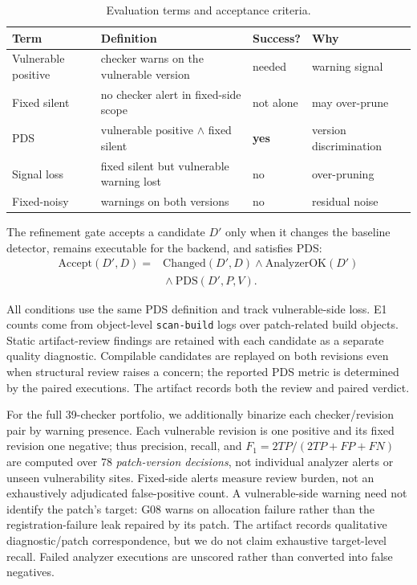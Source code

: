 \begin{table}[t]
  \centering
  \footnotesize
  \setlength{\tabcolsep}{3pt}
  \caption{Evaluation terms and acceptance criteria.}
  \label{tab:terminology}
  \begin{tabular}{@{}p{}p{}p{}p{}@{}}
    \toprule
    Term & Definition & Success? & Why \\
    \midrule
    Vulnerable positive & checker warns on the vulnerable version & needed & warning signal \\
    Fixed silent & no checker alert in fixed-side scope & not alone & may over-prune \\
    PDS & vulnerable positive $\wedge$ fixed silent & \textbf{yes} & version discrimination \\
    Signal loss & fixed silent but vulnerable warning lost & no & over-pruning \\
    Fixed-noisy & warnings on both versions & no & residual noise \\
    \bottomrule
  \end{tabular}
\end{table}

The refinement gate accepts a candidate $D'$ only when it changes the baseline detector, remains executable for the backend, and satisfies PDS:
\begin{equation}
\begin{aligned}
\mathrm{Accept}(D',D) ={}& \mathrm{Changed}(D',D)\land \mathrm{AnalyzerOK}(D')\\
&{}\land \mathrm{PDS}(D',P,V).
\end{aligned}
\label{eq:accept}
\end{equation}

All conditions use the same PDS definition and track vulnerable-side loss.  E1 counts come from object-level \texttt{scan-build} logs over patch-related build objects.
Static artifact-review findings are retained with each candidate as a separate quality diagnostic. Compilable candidates are replayed on both revisions even when structural review raises a concern; the reported PDS metric is determined by the paired executions. The artifact records both the review and paired verdict.

For the full 39-checker portfolio, we additionally binarize each checker/revision pair by warning presence. Each vulnerable revision is one positive and its fixed revision one negative; thus precision, recall, and $F_1=2TP/(2TP+FP+FN)$ are computed over 78 \emph{patch-version decisions}, not individual analyzer alerts or unseen vulnerability sites. Fixed-side alerts measure review burden, not an exhaustively adjudicated false-positive count. A vulnerable-side warning need not identify the patch's target: G08 warns on allocation failure rather than the registration-failure leak repaired by its patch. The artifact records qualitative diagnostic/patch correspondence, but we do not claim exhaustive target-level recall. Failed analyzer executions are unscored rather than converted into false negatives.

